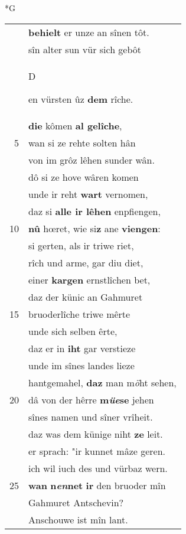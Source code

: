\documentclass[8pt,a4paper,notitlepage]{article}
\begin{document}
\begin{table}[ht]
\begin{minipage}[t]{0.5\linewidth}
\small
\begin{center}*G
\end{center}
\begin{tabular}{rl}
 & \textbf{behielt} er unze an sînen tôt.\\ 
 & sîn alter sun vür sich gebôt\\ 
 & \begin{large}D\end{large}en vürsten ûz \textbf{dem} rîche.\\ 
 & \textbf{die} kômen \textbf{al gelîche},\\ 
5 & wan si ze rehte solten hân\\ 
 & von im grôz lêhen sunder wân.\\ 
 & dô si ze hove wâren komen\\ 
 & unde ir reht \textbf{wart} vernomen,\\ 
 & daz si \textbf{alle ir lêhen} enpfiengen,\\ 
10 & \textbf{nû} hœret, wie si\textbf{z} ane \textbf{viengen}:\\ 
 & si gerten, als ir triwe riet,\\ 
 & rîch und arme, gar diu diet,\\ 
 & einer \textbf{kargen} ernstlîchen bet,\\ 
 & daz der künic an Gahmuret\\ 
15 & bruoderlîche triwe mêrte\\ 
 & unde sich selben êrte,\\ 
 & daz er in \textbf{iht} gar verstieze\\ 
 & unde im sînes landes lieze\\ 
 & hantgemahel, \textbf{daz} man m\textit{ö}ht sehen,\\ 
20 & dâ von der hêrre \textbf{m\textit{üe}se} jehen\\ 
 & sînes namen und sîner vrîheit.\\ 
 & daz was dem künige niht \textbf{ze} leit.\\ 
 & er sprach: "ir kunnet mâze geren.\\ 
 & ich wil iuch des und vürbaz wern.\\ 
25 & \textbf{wan} \textbf{n\textit{en}net} \textbf{ir} den bruoder mîn\\ 
 & Gahmuret Antschevin?\\ 
 & Anschouwe ist mîn lant.\\ 

\end{tabular}
\end{minipage}
\end{table}
\end{document}
